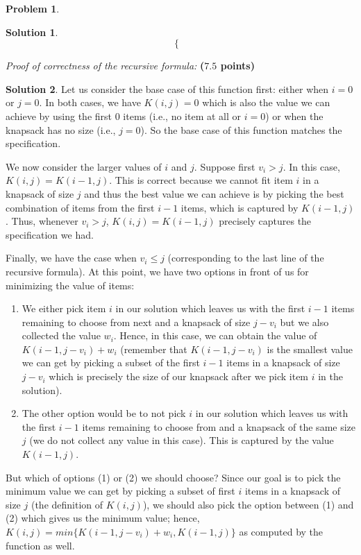 \documentclass{article}
\theoremstyle{definition}
\newtheorem{problem}{Problem}
\newtheorem*{solution*}{Solution}
\newenvironment{solution}{\begin{solution*}}{{} \end{solution*}}
\newcommand{\grade}[1]{\hfill{\textbf{($\mathbf{#1}$ points)}}}
\begin{document}
\begin{problem}
\begin{enumerate}[label=(\alph*)]
\begin{solution}
\[\begin{cases}
			\end{cases}
		\]
		\end{solution}
		\vfill
	\newpage
	
	\item \emph{Proof of correctness of the recursive formula:} \grade{7.5}
	
		\medskip
		\begin{solution}
		\item Let us consider the base case of this function first:  either when $i= 0$ or $j= 0$.  In both cases, we have $K(i,j) = 0$ which is also the value we can achieve by using the first 0 items (i.e., no item at all or $i= 0$) or when the knapsack has no size (i.e., $j= 0$).  So the base case of this function matches the specification.
		\item We now consider the larger values of $i$ and $j$.  Suppose first $v_i > j$.  In this case, $K(i,j) =K(i-1,j)$. This is correct because we cannot fit item $i$ in a knapsack of size $j$ and thus the best value we can achieve is by picking the best combination of items from the first $i-1$ items, which is captured by $K(i-1,j)$. Thus, whenever $v_i > j$, $K(i, j) = K(i-1, j)$ precisely captures the specification we had.
		\item Finally, we have the case when $v_i \leq j$ (corresponding to the last line of the recursive formula). At this point, we have two options in front of us for minimizing the value of items:
		\begin{enumerate}
			\item We either pick item $i$ in our solution which leaves us with the first $i-1$ items remaining to choose from next and a knapsack of size $j-v_i$ but we also collected the value $w_i$. Hence, in this case, we can obtain the value of $K(i-1, j-v_i) + w_i$ (remember that $K(i-1, j-v_i)$ is the smallest value we can get by picking a subset of the first $i-1$ items in a knapsack of size $j-v_i$ which is precisely the size of our knapsack after we pick item $i$ in the solution).
			\item The other option would be to not pick $i$ in our solution which leaves us with the first $i-1$ items remaining to choose from and a knapsack of the same size $j$ (we do not collect any value in this case).  This is captured by the value $K(i-1, j)$.
		\end{enumerate}
		\item But  which  of  options  (1)  or  (2)  we  should  choose? Since our goal is to pick the minimum value we can get by picking a subset of first $i$ items in a knapsack of size $j$ (the definition of $K(i, j)$), we should also pick the option between (1) and (2) which gives us the minimum value; hence,$K(i, j) = min\{K(i-1,j-v_i) + w_i, K(i-1,j)\}$ as computed by the function as well.



\end{solution}
\end{enumerate}
\end{problem}
\end{document}
